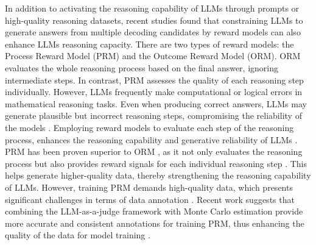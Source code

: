 In addition to activating the reasoning capability of LLMs through prompts or high-quality reasoning datasets, recent studies \cite{zheng2024processbench, zhang2025lessons, mcaleese2024llm} found that constraining LLMs to generate answers from multiple decoding candidates by reward models can also enhance LLMs reasoning capacity. There are two types of reward models: the Process Reward Model (PRM) and the Outcome Reward Model (ORM). ORM evaluates the whole reasoning process based on the final answer, ignoring intermediate steps. In contrast, PRM assesses the quality of each reasoning step individually. However, LLMs frequently make computational or logical errors in mathematical reasoning tasks. Even when producing correct answers, LLMs may generate plausible but incorrect reasoning steps, compromising the reliability of the models \cite{wang2024math}. Employing reward models to evaluate each step of the reasoning process, enhances the reasoning capability and generative reliability of LLMs \cite{lightman2023let}. PRM has been proven superior to ORM \cite{wu2023fine}, as it not only evaluates the reasoning process but also provides reward signals for each individual reasoning step \cite{uesato2022solving, pan2023let}. This helps generate higher-quality data, thereby strengthening the reasoning capability of LLMs. However, training PRM demands high-quality data, which presents significant challenges in terms of data annotation \cite{luo2024improve}. Recent work suggests that combining the LLM-as-a-judge \cite{zheng2023judging} framework with Monte Carlo estimation provide more accurate and consistent annotations for training PRM, thus enhancing the quality of the data for model training \cite{zhang2025lessons}.

\vspace{-0.08cm}